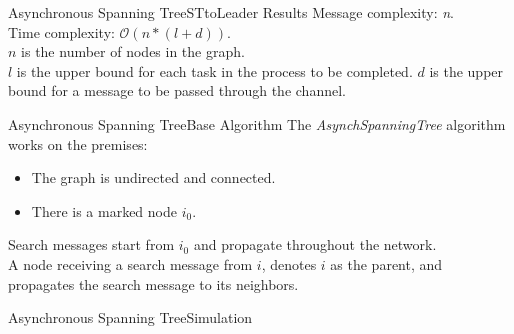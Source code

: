 \documentclass[pdf]{beamer}
\begin{document}
\begin{frame}{Asynchronous Spanning Tree}{STtoLeader Results}
    Message complexity: \emph{n}.\\
    Time complexity: $\mathcal{O}(n*(l+d))$.\\
    \vspace{12pt}
    $n$ is the number of nodes in the graph.\\
    $l$ is the upper bound for each task in the process to be completed.
    $d$ is the upper bound for a message to be passed through the channel.
\end{frame}

\begin{frame}{Asynchronous Spanning Tree}{Base Algorithm}
    The \emph{AsynchSpanningTree} algorithm works on the premises:
    \begin{itemize}
        \item{The graph is undirected and connected.}
        \pause
        \item{There is a marked node $i_0$.}
    \end{itemize}
    \vspace{12pt}
    \pause
    Search messages start from $i_0$ and propagate throughout the network.\\
    \pause
    \vspace{12pt}
    A node receiving a search message from $i$, denotes $i$ as the parent, and
    propagates the search message to its neighbors.
\end{frame}

\begin{frame}{Asynchronous Spanning Tree}{Simulation}
\end{frame}
\end{document}
